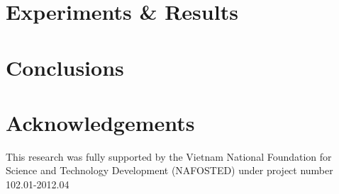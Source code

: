 \documentclass{llncs}
\begin{document}
\section{Experiments \& Results}


\section{Conclusions}


\section{Acknowledgements}
This research was fully supported by the Vietnam National Foundation for Science and Technology Development (NAFOSTED) under project number 102.01-2012.04



\end{document}
